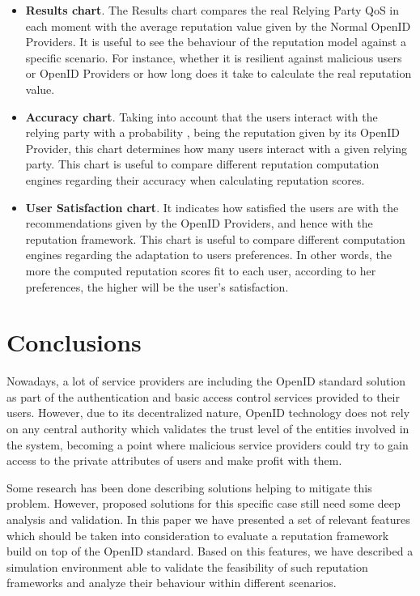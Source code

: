 \documentclass{llncs}
\begin{document}
\begin{itemize}

\item \textbf{Results chart}. The Results chart compares the real Relying Party QoS in each moment with the average reputation value given by the Normal OpenID Providers. It is useful to see the behaviour of the reputation model against a specific scenario. For instance, whether it is resilient against malicious users or OpenID Providers or how long does it take to calculate the real reputation value.

\item \textbf{Accuracy chart}. Taking into account that the users interact with the relying party with a probability , being  the reputation given by its OpenID Provider, this chart determines how many users interact with a given relying party. This chart
is useful to compare different reputation computation engines regarding their accuracy when calculating reputation scores.



\item \textbf{User Satisfaction chart}. It indicates how satisfied the users are with the recommendations given by the OpenID Providers, and hence with the reputation framework.
This chart
is useful to compare different computation engines regarding the adaptation to users preferences. In other words, the more the computed reputation scores fit to each user, according to her preferences, the higher will be the user's satisfaction.



\end{itemize}

\section{Conclusions}\label{sec:conclusions}

Nowadays, a lot of service providers are including the OpenID standard solution as part of the authentication and basic access control services provided to their users. However, due to its decentralized nature, OpenID technology does not rely on any central authority which validates the trust level of the entities involved in the system, becoming a point where malicious service providers could try to gain access to the private attributes of users and make profit with them.

Some research has been done describing solutions helping to mitigate this problem. However, proposed solutions for this specific case still need some deep analysis and validation. In this paper we have presented a set of relevant features which should be taken into consideration to evaluate a reputation framework build on top of the OpenID standard. Based on this features, we have described a simulation environment able to validate the feasibility of such reputation frameworks and analyze their behaviour within different scenarios.



\end{document}
